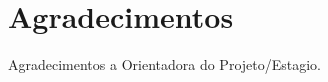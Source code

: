 \label{Agradecimentos}
\cleardoublepage
\section*{Agradecimentos}
Agradecimentos a Orientadora do Projeto/Estagio.

